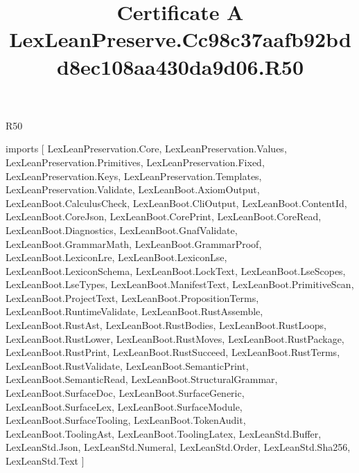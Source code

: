\begin{lexlean}{R50}
\title{Certificate A LexLeanPreserve.Cc98c37aafb92bdd8ec108aa430da9d06.R50}
\begin{coremodule}
imports [
  LexLeanPreservation.Core,
  LexLeanPreservation.Values,
  LexLeanPreservation.Primitives,
  LexLeanPreservation.Fixed,
  LexLeanPreservation.Keys,
  LexLeanPreservation.Templates,
  LexLeanPreservation.Validate,
  LexLeanBoot.AxiomOutput,
  LexLeanBoot.CalculusCheck,
  LexLeanBoot.CliOutput,
  LexLeanBoot.ContentId,
  LexLeanBoot.CoreJson,
  LexLeanBoot.CorePrint,
  LexLeanBoot.CoreRead,
  LexLeanBoot.Diagnostics,
  LexLeanBoot.GnafValidate,
  LexLeanBoot.GrammarMath,
  LexLeanBoot.GrammarProof,
  LexLeanBoot.LexiconLre,
  LexLeanBoot.LexiconLse,
  LexLeanBoot.LexiconSchema,
  LexLeanBoot.LockText,
  LexLeanBoot.LseScopes,
  LexLeanBoot.LseTypes,
  LexLeanBoot.ManifestText,
  LexLeanBoot.PrimitiveScan,
  LexLeanBoot.ProjectText,
  LexLeanBoot.PropositionTerms,
  LexLeanBoot.RuntimeValidate,
  LexLeanBoot.RustAssemble,
  LexLeanBoot.RustAst,
  LexLeanBoot.RustBodies,
  LexLeanBoot.RustLoops,
  LexLeanBoot.RustLower,
  LexLeanBoot.RustMoves,
  LexLeanBoot.RustPackage,
  LexLeanBoot.RustPrint,
  LexLeanBoot.RustSucceed,
  LexLeanBoot.RustTerms,
  LexLeanBoot.RustValidate,
  LexLeanBoot.SemanticPrint,
  LexLeanBoot.SemanticRead,
  LexLeanBoot.StructuralGrammar,
  LexLeanBoot.SurfaceDoc,
  LexLeanBoot.SurfaceGeneric,
  LexLeanBoot.SurfaceLex,
  LexLeanBoot.SurfaceModule,
  LexLeanBoot.SurfaceTooling,
  LexLeanBoot.TokenAudit,
  LexLeanBoot.ToolingAst,
  LexLeanBoot.ToolingLatex,
  LexLeanStd.Buffer,
  LexLeanStd.Json,
  LexLeanStd.Numeral,
  LexLeanStd.Order,
  LexLeanStd.Sha256,
  LexLeanStd.Text
]


\end{coremodule}
\end{lexlean}
